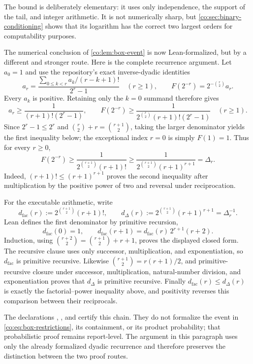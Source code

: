 The bound is deliberately elementary: it uses only independence, the support
of the tail, and integer arithmetic.  It is not numerically sharp, but
\cref{co:sec:binary-conditioning} shows that its logarithm has the correct two
largest orders for computability purposes.

The numerical conclusion of \cref{co:lem:box-event} is now Lean-formalized, but
by a different and stronger route.  Here is the complete recurrence argument.
Let $a_0=1$ and use the repository's exact inverse-dyadic identities
\[
 a_r=
 \frac{\displaystyle\sum_{0\le k<r}a_k/(r-k+1)!}{2^r-1}
 \quad(r\ge1),
 \qquad
 F(2^{-r})=2^{-\binom r2}a_r.
\]
Every $a_k$ is positive.  Retaining only the $k=0$ summand therefore gives
\[
 a_r\ge\frac{1}{(r+1)!(2^r-1)},
 \qquad
 F(2^{-r})\ge
 \frac{1}{2^{\binom r2}(r+1)!(2^r-1)}
 \quad(r\ge1).
\]
Since $2^r-1\le2^r$ and
$\binom r2+r=\binom{r+1}{2}$, taking the larger denominator yields the
first inequality below; the exceptional index $r=0$ is simply $F(1)=1$.
Thus for every $r\ge0$,
\begin{equation}\label{co:eq:factorial-endpoint-lower}
 F(2^{-r})\ge
 \frac{1}{2^{\binom{r+1}{2}}(r+1)!}
 \ge
 \frac{1}{2^{\binom{r+1}{2}}(r+1)^{r+1}}
 =\Delta_r.
\end{equation}
Indeed, $(r+1)!\le(r+1)^{r+1}$ proves the second inequality after
multiplication by the positive power of two and reversal under reciprocation.

For the executable arithmetic, write
\[
 d_{\mathrm{fac}}(r):=2^{\binom{r+1}{2}}(r+1)!,
 \qquad
 d_{\Delta}(r):=2^{\binom{r+1}{2}}(r+1)^{r+1}=\Delta_r^{-1}.
\]
Lean defines the first denominator by primitive recursion,
\[
 d_{\mathrm{fac}}(0)=1,
 \qquad
 d_{\mathrm{fac}}(r+1)
 =d_{\mathrm{fac}}(r)\,2^{r+1}(r+2).
\]
Induction, using
$\binom{r+2}{2}=\binom{r+1}{2}+r+1$, proves the displayed closed form.
The recursive clause uses only successor, multiplication, and exponentiation,
so $d_{\mathrm{fac}}$ is primitive recursive.  Likewise
$\binom{r+1}{2}=r(r+1)/2$, and primitive-recursive closure under successor,
multiplication, natural-number division, and exponentiation proves that
$d_{\Delta}$ is primitive recursive.  Finally
$d_{\mathrm{fac}}(r)\le d_{\Delta}(r)$ is exactly the factorial--power
inequality above, and positivity reverses this comparison between their
reciprocals.

The declarations
,
, and
 certify this
chain.  They do not formalize the event in
\eqref{co:eq:box-restrictions}, its containment, or its product probability;
that probabilistic proof remains report-level.  The argument in this paragraph
uses only the already formalized dyadic recurrence and therefore preserves the
distinction between the two proof routes.

